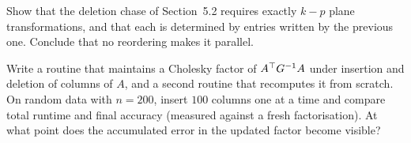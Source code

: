 \begin{exercises}
\begin{exercise}
Show that the deletion chase of Section~5.2 requires exactly $k - p$ plane
transformations, and that each is determined by entries written by the previous
one. Conclude that no reordering makes it parallel.
\end{exercise}

\begin{exercise}[Implementation]
Write a routine that maintains a Cholesky factor of $A^{\top} G^{-1}A$ under insertion
and deletion of columns of $A$, and a second routine that recomputes it from
scratch. On random data with $n = 200$, insert $100$ columns one at a time and
compare total runtime and final accuracy (measured against a fresh factorisation).
At what point does the accumulated error in the updated factor become visible?
\end{exercise}

\end{exercises}
